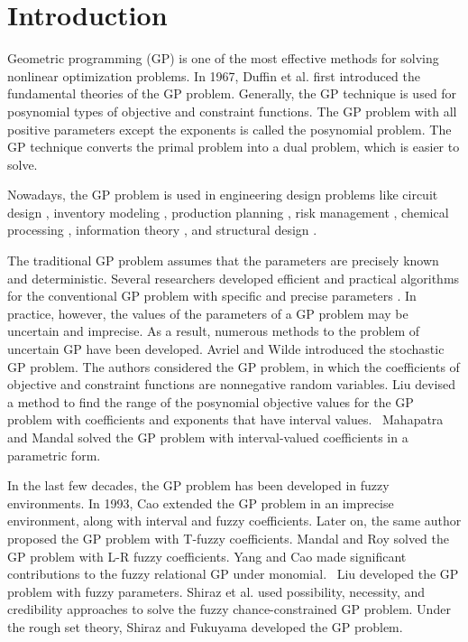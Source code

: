\section{Introduction}\label{sec.1}
Geometric programming (GP) is one of the most effective methods for solving nonlinear optimization problems. In 1967, Duffin et al. \cite{Duffin 1967} first introduced the fundamental theories of the GP problem. Generally, the GP technique is used for posynomial types of objective and constraint functions. The GP problem with all positive parameters except the exponents is called the posynomial problem. The GP technique converts the primal problem into a dual problem, which is easier to solve.
\par Nowadays, the GP problem is used in engineering design problems like circuit design \cite{Chu 2001,Hershenson 2001}, inventory modeling \cite{Mandal 2006,Roy 1997,Worrall 1982}, production planning \cite{Cheng 1991,Choi 1996,Islam 2007,Jung 2001,Kim 1998,Lee 1993}, risk management \cite{Scott 1995}, chemical processing \cite{Passy 1968,Ruckaert 1978,Wall 1986}, information theory \cite{Chiang 2005}, and structural design \cite{Gupta 1986}.
\par The traditional GP problem assumes that the parameters are precisely known and deterministic. Several researchers developed efficient and practical algorithms for the conventional GP problem with specific and precise parameters \cite{Avriel 1975,Beightler 1976,Duffin 1967,Duffin 1973,Fang 1988,Kortanek 1992,Kortanek 1997,Maranas 1997,Rajgopal 1990,Rajgopal 1992,Rajgopal 2002}. In practice, however, the values of the parameters of a GP problem may be uncertain and imprecise. As a result, numerous methods to the problem of uncertain GP have been developed. Avriel and Wilde \cite{Avriel 1969} introduced the stochastic GP problem. The authors considered the GP problem, in which the coefficients of objective and constraint functions are nonnegative random variables. Liu \cite{Liu 2006} devised a method to find the range of the posynomial objective values for the GP problem with coefficients and exponents that have interval values.  Mahapatra and Mandal \cite{Mahapatra 2012} solved the GP problem with interval-valued coefficients in a parametric form. 
\par In the last few decades, the GP problem has been developed in fuzzy environments. In 1993, Cao \cite{Cao 1993} extended the GP problem in an imprecise environment, along with interval and fuzzy coefficients. Later on, the same author \cite{Cao 1997} proposed the GP problem with T-fuzzy coefficients. Mandal and Roy \cite{Mandal 2006} solved the GP problem with L-R fuzzy coefficients. Yang and Cao \cite{Yang 2007} made significant contributions to the fuzzy relational GP under monomial.  Liu \cite{Liu 2007} developed the GP problem with fuzzy parameters. Shiraz et al. \cite{Shiraz 2017} used possibility, necessity, and credibility approaches to solve the fuzzy chance-constrained GP problem. Under the rough set theory, Shiraz and Fukuyama \cite{Shiraz 2018} developed the GP problem.

